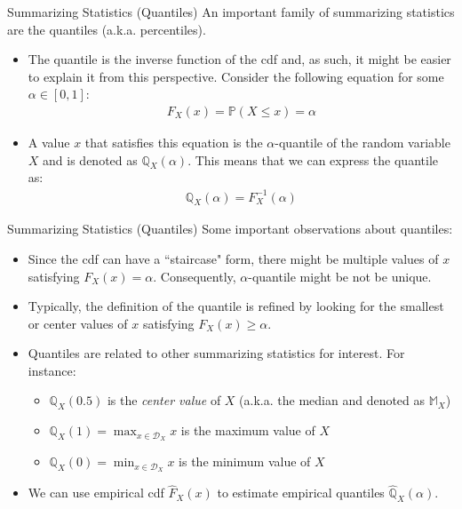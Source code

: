 \documentclass[handout,9pt]{beamer}
\begin{document}
%
\begin{frame}{Summarizing Statistics (Quantiles)}
An important family of summarizing statistics are the quantiles (a.k.a. percentiles). 
\begin{block}{}
\begin{itemize}
 \setlength{\itemsep}{10pt}
\item The quantile is the inverse function of the cdf and, as such, it might be easier to explain it from this perspective.  Consider the following equation for some $\alpha \in [0,1]$:
\begin{align*}
F_X(x)=\mathbb{P}(X\leq x)=\alpha 
\end{align*}
\item A value $x$ that satisfies this equation is the $\alpha$-quantile of the random variable $X$ and is denoted as $\mathbb{Q}_X(\alpha)$. This means that we can express the quantile as:
\begin{align*}
\mathbb{Q}_X(\alpha)=F^{-1}_X(\alpha) 
\end{align*}
\end{itemize}
\end{block}
\end{frame}

%
\begin{frame}{Summarizing Statistics (Quantiles)}
Some important observations about quantiles:
\begin{block}{}
\begin{itemize}
 \setlength{\itemsep}{10pt}
\item Since the cdf can have a ``staircase" form, there might be multiple values of $x$ satisfying $F_X(x)=\alpha$. Consequently, $\alpha$-quantile might be not be unique. 

\item Typically,  the definition of the quantile is refined by looking for the smallest or center values of $x$ satisfying $F_X(x)\geq \alpha$. 

\item Quantiles are related to other summarizing statistics for interest. For instance: 
\begin{itemize}
 \setlength{\itemsep}{5pt}
\item $\mathbb{Q}_{X}(0.5)$ is the {\em center value} of $X$ (a.k.a. the median and denoted as $\mathbb{M}_X$)
\item $\mathbb{Q}_X(1)=\displaystyle\max_{x\in \mathcal{D}_X }x$ is the maximum value of $X$
\item $\mathbb{Q}_{X}(0)=\displaystyle \min_{x\in \mathcal{D}_X }x$ is the minimum value of $X$ 
\end{itemize}
\item We can use empirical cdf $\hat{F}_X(x)$ to estimate empirical quantiles $\hat{\mathbb{Q}}_X(\alpha)$.
\end{itemize}
\end{block}
\end{frame}
\end{document}
